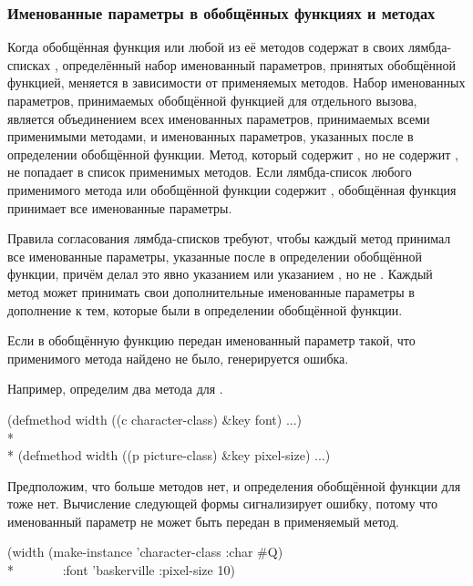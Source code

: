 \subsubsection{Именованные параметры в обобщённых функциях и методах}

Когда обобщённая функция или любой из её методов содержат в своих лямбда-списках
, определённый набор именованный параметров, принятых обобщённой
функцией, меняется в зависимости от применяемых методов. Набор именованных
параметров, принимаемых обобщённой функцией для отдельного вызова, является
объединением всех именованных параметров, принимаемых всеми применимыми
методами, и именованных параметров, указанных после  в определении
обобщённой функции. Метод, который содержит , но не содержит
, не попадает в список применимых методов. Если лямбда-список любого
применимого метода или обобщённой функции содержит ,
обобщённая функция принимает все именованные параметры.

Правила согласования лямбда-списков требуют, чтобы каждый метод принимал все
именованные параметры, указанные после  в определении обобщённой
функции, причём делал это явно указанием  или указанием
, но не . Каждый метод может принимать свои дополнительные
именованные параметры в дополнение к тем, которые были в определении обобщённой
функции.

Если в обобщённую функцию передан именованный параметр такой, что применимого
метода найдено не было, генерируется ошибка.

Например, определим два метода для .

\begin{lisp}
(defmethod width ((c character-class) \&key font) ...)\\*
\\*
(defmethod width ((p picture-class) \&key pixel-size) ...)
\end{lisp}

Предположим, что больше методов нет, и определения обобщённой функции для
 тоже нет. Вычисление следующей формы сигнализирует ошибку, потому
что именованный параметр  не может быть передан в применяемый
метод.

\begin{lisp}
(width (make-instance 'character-class :char \#{\Xbackslash}Q) \\*
~~~~~~~:font 'baskerville :pixel-size 10)
\end{lisp}

